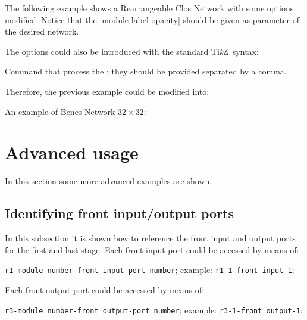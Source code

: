 \documentclass{ltxdoc} %
\newcommand\Tikz{Ti\textit kZ}
\begin{document}
The following example shows a Rearrangeable Clos Network with some options modified. Notice that the |module label opacity| should be given as parameter of the desired network.

\begin{codeexample}[]
\begin{tikzpicture}[N=9,r1=3,M=9,r3=3]
    \node[module size=0.5cm,pin length factor=0.5,
        module ysep=1, module xsep=1.25,
        clos rear={module label opacity=0}] {};
\end{tikzpicture}
\end{codeexample}

The options could also be introduced with the standard \Tikz\ syntax:
\begin{command}{{\tikzset}}
    Command that process the : they should be provided separated by a comma.
\end{command}
Therefore, the previous example could be modified into:
\begin{codeexample}[]
\tikzset{module size=0.5cm,pin length factor=0.5,
         module ysep=1, module xsep=1.25,}
\begin{tikzpicture}[N=9,r1=3,M=9,r3=3]
    \node[clos rear={module label opacity=0}] {};
\end{tikzpicture}
\end{codeexample}
An example of Benes Network $32 \times 32$:
\begin{codeexample}[]
\tikzset{module size=0.6cm,pin length factor=0.6,
         module ysep=0.9, module xsep=1.7,}
\begin{tikzpicture}[P=32]
    \node[benes] {};
\end{tikzpicture}
\end{codeexample}

\section{Advanced usage}
In this section some more advanced examples are shown.

\subsection{Identifying front input/output ports}
In this subsection it is shown how to reference the front input and output ports for the first and last stage. Each front input port could be accessed by means of:
\begin{flushleft}
\verb|r1-|\bgroup\color{red!75!black}\verb|module number|\egroup\verb|-|\bgroup\color{red!75!black}\verb|front input|\egroup\verb|-|\bgroup\color{red!75!black}\verb|port number|\egroup; example: \verb|r1-1-front input-1|;
\end{flushleft}
Each front output port could be accessed by means of:
\begin{flushleft}
\verb|r3-|\bgroup\color{red!75!black}\verb|module number|\egroup\verb|-|\bgroup\color{red!75!black}\verb|front output|\egroup\verb|-|\bgroup\color{red!75!black}\verb|port number|\egroup; example: \verb|r3-1-front output-1|;
\end{flushleft}
\end{document}
